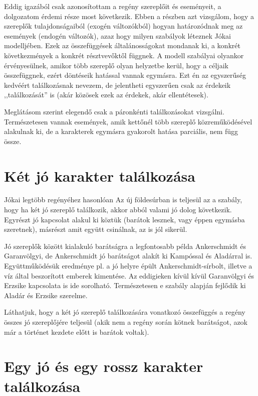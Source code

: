\documentclass[a4paper,12pt]{thesis-ekf}
\begin{document}
    Eddig igazából csak azonosítottam a regény szereplőit és eseményeit, a dolgozatom érdemi része most következik.
    Ebben a részben azt vizsgálom, hogy a szereplők tulajdonságaiból (exogén változókból)
        hogyan határozódnak meg az események (endogén változók), azaz hogy milyen szabályok léteznek Jókai modelljében.
    Ezek az összefüggések általánosságokat mondanak ki, a konkrét következmények a konkrét résztvevőktől függnek.
    A modell szabályai olyankor érvényesülnek, amikor több szereplő olyan helyzetbe kerül, hogy a céljaik összefüggnek,
        ezért döntéseik hatással vannak egymásra.
    Ezt én az egyszerűség kedvéért találkozásnak nevezem, de jelentheti egyszerűen csak az érdekeik ,,találkozását'' is
        (akár közösek ezek az érdekek, akár ellentétesek).

    Meglátásom szerint elegendő csak a páronkénti találkozásokat vizsgálni.
    Természetesen vannak események, amik kettőnél több szereplő közreműködésével alakulnak ki,
        de a karakterek egymásra gyakorolt hatása parciális, nem függ össze.

    \section{Két jó karakter találkozása}\label{sec:ket-jo-karakter-talalkozasa}

    Jókai legtöbb regényéhez hasonlóan Az új földesúrban is teljesül az a szabály,
        hogy ha két jó szereplő találkozik, akkor abból valami jó dolog következik.
    Egyrészt jó kapcsolat alakul ki köztük (barátok lesznek, vagy éppen egymásba szeretnek),
        másrészt amit együtt csinálnak, az is jól sikerül.

    Jó szereplők között kialakuló barátságra a legfontosabb példa Ankerschmidt és Garanvölgyi,
        de Ankerschmidt jó barátságot alakít ki Kampóssal és Aladárral is.
    Együttműködésük eredménye pl. a jó helyre épült Ankerschmidt-sírbolt, illetve a víz által beszorított emberek kimentése.
    Az eddigieken kívül kívül Garanvölgyi és Erzsike kapcsolata is ide sorolható.
    Természetesen e szabály alapján fejlődik ki Aladár és Erzsike szerelme.

    Láthatjuk, hogy a két jó szereplő találkozására vonatkozó összefüggés a regény összes jó szereplőjére teljesül
        (akik nem a regény során kötnek barátságot, azok már a történet kezdete előtt is barátok voltak).

    \section{Egy jó és egy rossz karakter találkozása}\label{sec:egy-jo-es-egy-rossz-karakter-talalkozasa}
\end{document}
